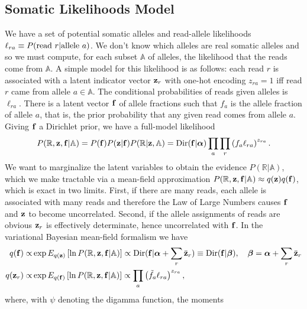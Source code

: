 \documentclass[nofootinbib,amssymb,amsmath]{revtex4}
\newcommand{\vf}{{\bf f}}
\newcommand{\vz}{{\bf z}}
\newcommand{\valpha}{{\bm{\alpha}}}
\newcommand{\vbeta}{{\bm{\beta}}}
\begin{document}
\subsection{Somatic Likelihoods Model}\label{introduction}
We have a set of potential somatic alleles and read-allele likelihoods $\ell_{ra} \equiv P({\rm read~}r|{\rm allele~}a)$.  We don't know which alleles are real somatic alleles and so we must compute, for each subset $\mathbb{A}$ of alleles, the likelihood that the reads come from $\mathbb{A}$.  A simple model for this likelihood is as follows: each read $r$ is associated with a latent indicator vector $\vz_r$ with one-hot encoding $z_{ra} = 1$ iff read $r$ came from allele $a \in \mathbb{A}$.  The conditional probabilities of reads given alleles is $\ell_{ra}$.
There is a latent vector $\vf$ of allele fractions such that $f_a$ is the allele fraction of allele $a$, that is, the prior probability that any given read comes from allele $a$.  Giving $\vf$ a Dirichlet prior, we have a full-model likelihood
\begin{equation}
P(\mathbb{R}, \vz, \vf | \mathbb{A}) = P(\vf) P(\vz | \vf)  P( \mathbb{R} | \vz, \mathbb{A}) = {\rm Dir}(\vf | \valpha) \prod_a  \prod_r \left( f_a \ell_{ra}\right)^{z_{ra}}.
\label{full_likelihood}
\end{equation}
We want to marginalize the latent variables to obtain the evidence $P(\mathbb{R} | \mathbb{A})$, which we make tractable via a mean-field approximation $P(\mathbb{R}, \vz, \vf | \mathbb{A}) \approx q(\vz) q(\vf)$, which is exact in two limits.  First, if there are many reads, each allele is associated with many reads and therefore the Law of Large Numbers causes $\vf$ and $\vz$ to become uncorrelated.  Second, if the allele assignments of reads are obvious $\vz_r$ is effectively determinate, hence uncorrelated with $\vf$.  In the variational Bayesian mean-field formalism we have
\begin{align}
q(\vf) \propto& \exp E_{q(\vz)} \left[ \ln P(\mathbb{R}, \vz, \vf | \mathbb{A}) \right] \propto {\rm Dir}(\vf | \valpha + \sum_r \bar{\vz}_r) \equiv {\rm Dir}(\vf | \vbeta), \quad \vbeta = \valpha + \sum_r \bar{\vz}_r \label{z_mean_field}  \\
q(\vz_r) \propto& \exp E_{q(\vf)} \left[ \ln P(\mathbb{R}, \vz, \vf | \mathbb{A}) \right]  \propto \prod_a \left( \tilde{f}_a \ell_{ra}\right)^{z_{ra}}, \label{f_mean_field}
\end{align}
where, with $\psi$ denoting the digamma function, the moments
\end{document}

